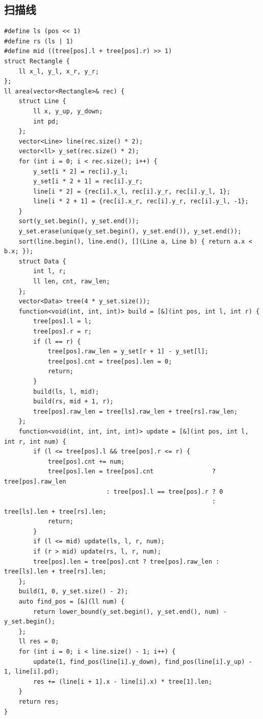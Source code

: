 \documentclass[UTF8, twoside]{ctexart}
\begin{document}
\begin{sloppypar}
\subsection{扫描线}

\begin{lstlisting}[style=cpp]
#define ls (pos << 1)
#define rs (ls | 1)
#define mid ((tree[pos].l + tree[pos].r) >> 1)
struct Rectangle {
    ll x_l, y_l, x_r, y_r;
};
ll area(vector<Rectangle>& rec) {
    struct Line {
        ll x, y_up, y_down;
        int pd;
    };
    vector<Line> line(rec.size() * 2);
    vector<ll> y_set(rec.size() * 2);
    for (int i = 0; i < rec.size(); i++) {
        y_set[i * 2] = rec[i].y_l;
        y_set[i * 2 + 1] = rec[i].y_r;
        line[i * 2] = {rec[i].x_l, rec[i].y_r, rec[i].y_l, 1};
        line[i * 2 + 1] = {rec[i].x_r, rec[i].y_r, rec[i].y_l, -1};
    }
    sort(y_set.begin(), y_set.end());
    y_set.erase(unique(y_set.begin(), y_set.end()), y_set.end());
    sort(line.begin(), line.end(), [](Line a, Line b) { return a.x < b.x; });
    struct Data {
        int l, r;
        ll len, cnt, raw_len;
    };
    vector<Data> tree(4 * y_set.size());
    function<void(int, int, int)> build = [&](int pos, int l, int r) {
        tree[pos].l = l;
        tree[pos].r = r;
        if (l == r) {
            tree[pos].raw_len = y_set[r + 1] - y_set[l];
            tree[pos].cnt = tree[pos].len = 0;
            return;
        }
        build(ls, l, mid);
        build(rs, mid + 1, r);
        tree[pos].raw_len = tree[ls].raw_len + tree[rs].raw_len;
    };
    function<void(int, int, int, int)> update = [&](int pos, int l, int r, int num) {
        if (l <= tree[pos].l && tree[pos].r <= r) {
            tree[pos].cnt += num;
            tree[pos].len = tree[pos].cnt                ? tree[pos].raw_len
                            : tree[pos].l == tree[pos].r ? 0
                                                         : tree[ls].len + tree[rs].len;
            return;
        }
        if (l <= mid) update(ls, l, r, num);
        if (r > mid) update(rs, l, r, num);
        tree[pos].len = tree[pos].cnt ? tree[pos].raw_len : tree[ls].len + tree[rs].len;
    };
    build(1, 0, y_set.size() - 2);
    auto find_pos = [&](ll num) {
        return lower_bound(y_set.begin(), y_set.end(), num) - y_set.begin();
    };
    ll res = 0;
    for (int i = 0; i < line.size() - 1; i++) {
        update(1, find_pos(line[i].y_down), find_pos(line[i].y_up) - 1, line[i].pd);
        res += (line[i + 1].x - line[i].x) * tree[1].len;
    }
    return res;
}
\end{lstlisting}


\end{sloppypar}
\end{document}
